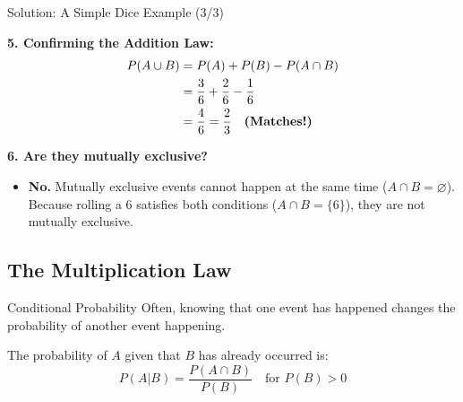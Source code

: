 \begin{frame}{Solution: A Simple Dice Example (3/3)}
    \begin{solutioncont}
        \textbf{5. Confirming the Addition Law:}
        \begin{align*}
            P(A \cup B) &= P(A) + P(B) - P(A \cap B) \\
                        &= \frac{3}{6} + \frac{2}{6} - \frac{1}{6} \\
                        &= \frac{4}{6} = \frac{2}{3} \quad \text{\textbf{(Matches!)}}
        \end{align*}

        \pause \vspace{0.4cm}
        
        \textbf{6. Are they mutually exclusive?}
        \begin{itemize}
            \item \textbf{No.} Mutually exclusive events cannot happen at the same time ($A \cap B = \varnothing$). Because rolling a 6 satisfies both conditions ($A \cap B = \{6\}$), they are not mutually exclusive.
        \end{itemize}
    \end{solutioncont}
\end{frame}


\subsection{The Multiplication Law}

\begin{frame}{Conditional Probability}
    Often, knowing that one event has happened changes the probability of another event happening.

    \begin{definition}
        The probability of $A$ given that $B$ has already occurred is:
        \[ P(A|B) = \frac{P(A \cap B)}{P(B)} \quad \text{for } P(B) > 0 \]
    \end{definition}

\end{frame}

